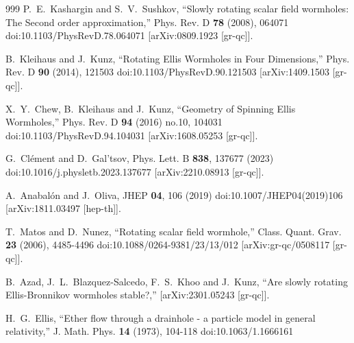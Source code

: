\documentclass[aps,preprint,groupedaddress,nofootinbib,superscriptaddress,showkeys,showpacs,eqsecnum,amsmath,amssymb]{revtex4-1}
\begin{document}
\begin{thebibliography}{999}
P.~E.~Kashargin and S.~V.~Sushkov,
``Slowly rotating scalar field wormholes: The Second order approximation,''
Phys. Rev. D \textbf{78} (2008), 064071
doi:10.1103/PhysRevD.78.064071
[arXiv:0809.1923 [gr-qc]].


B.~Kleihaus and J.~Kunz,
``Rotating Ellis Wormholes in Four Dimensions,''
Phys. Rev. D \textbf{90} (2014), 121503
doi:10.1103/PhysRevD.90.121503
[arXiv:1409.1503 [gr-qc]].

X.~Y.~Chew, B.~Kleihaus and J.~Kunz,
``Geometry of Spinning Ellis Wormholes,''
Phys. Rev. D \textbf{94} (2016) no.10, 104031
doi:10.1103/PhysRevD.94.104031
[arXiv:1608.05253 [gr-qc]].

G.~Cl\'ement and D.~Gal'tsov,
Phys. Lett. B \textbf{838}, 137677 (2023)
doi:10.1016/j.physletb.2023.137677
[arXiv:2210.08913 [gr-qc]].


A.~Anabal\'on and J.~Oliva,
JHEP \textbf{04}, 106 (2019)
doi:10.1007/JHEP04(2019)106
[arXiv:1811.03497 [hep-th]].





T.~Matos and D.~Nunez,
``Rotating scalar field wormhole,''
Class. Quant. Grav. \textbf{23} (2006), 4485-4496
doi:10.1088/0264-9381/23/13/012
[arXiv:gr-qc/0508117 [gr-qc]].




B.~Azad, J.~L.~Blazquez-Salcedo, F.~S.~Khoo and J.~Kunz,
``Are slowly rotating Ellis-Bronnikov wormholes stable?,''
[arXiv:2301.05243 [gr-qc]].

H.~G.~Ellis,
``Ether flow through a drainhole - a particle model in general relativity,''
J. Math. Phys. \textbf{14} (1973), 104-118
doi:10.1063/1.1666161


\end{thebibliography}
\end{document}
